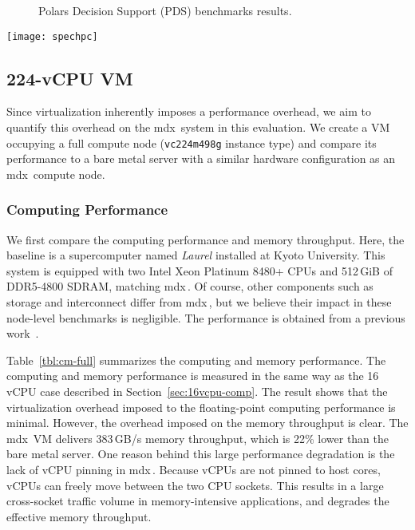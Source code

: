 \documentclass[a4paper,twoside]{article}
\newcommand{\mdx}{mdx\,\uppercase\expandafter{\romannumeral 2\relax}}
\begin{document}
\begin{figure}
    \centering
    \caption{Polars Decision Support (PDS) benchmarks results.}\label{fig:pds}
\end{figure}

\begin{figure*}
\centering
\texttt{[image: spechpc]}%
\caption{SPEChpc 2021 tiny size results on a bare metal server and mdx II.}\label{fig:spechpc}
\end{figure*}

\subsection{224-vCPU VM}

Since virtualization inherently imposes a performance overhead, we aim to quantify this overhead on
the \mdx{} system in this evaluation. We create a VM occupying a full compute node (\verb|vc224m498g|
instance type) and compare its
performance to a bare metal server with a similar hardware configuration as an \mdx{} compute node.

\subsubsection{Computing Performance}

We first compare the computing performance and memory throughput. Here, the baseline is a
supercomputer named \emph{Laurel} installed at Kyoto University. This system is equipped with two
Intel Xeon Platinum 8480+ CPUs and 512\,GiB of DDR5-4800 SDRAM, matching \mdx{}. Of course, other
components such as storage and interconnect differ from \mdx{}, but we believe their impact in these node-level benchmarks is negligible. The performance is obtained from a previous
work~\cite{Fukazawa2024}.

Table~\ref{tbl:cm-full} summarizes the computing and memory performance. The computing and memory
performance is measured in the same way as the 16 vCPU case described in
Section~\ref{sec:16vcpu-comp}. The result shows that the virtualization overhead imposed to the
floating-point computing performance is minimal. However, the overhead imposed on the memory
throughput is clear. The \mdx{} VM delivers 383\,GB/s memory throughput, which is 22\% lower than
the bare metal server. One reason behind this large performance degradation is the lack of vCPU
pinning in \mdx{}. Because vCPUs are not pinned to host cores, vCPUs can freely move between
the two CPU sockets. This results in a large cross-socket traffic volume in memory-intensive
applications, and degrades the effective memory throughput.
\end{document}
